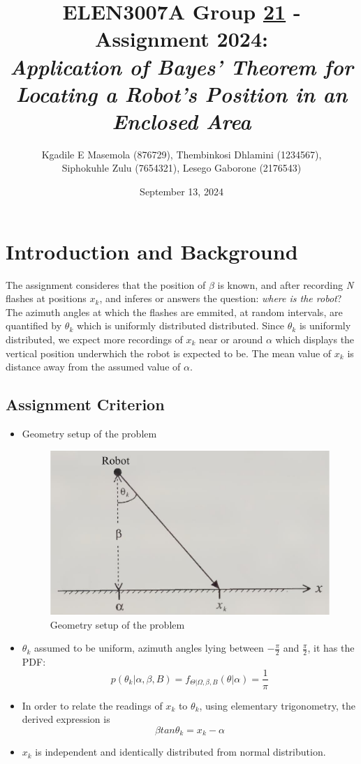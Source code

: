 \documentclass[a4paper,11pt]{article}
\title{ELEN3007A Group \underline{21} - Assignment 2024: \\ 
\large \emph{Application of Bayes’ Theorem for Locating a Robot’s
Position in an Enclosed Area}}
\author{Kgadile E Masemola (876729),  Thembinkosi Dhlamini (1234567),
 \\Siphokuhle Zulu (7654321), Lesego Gaborone (2176543)}
\date{September 13, 2024}
\begin{document}
\maketitle

\section*{Introduction and Background}
The assignment consideres that the position of $\beta$ is known, and after recording \emph{N} flashes at positions $x_k$, and inferes or answers the question: \emph{where is the robot}?\\
The azimuth angles at which the flashes are emmited, at random intervals, are quantified by $\theta_k$ which is uniformly distributed distributed. Since $\theta_k$ is uniformly distributed, we expect more recordings of $x_k$ near or around $\alpha$ which displays the vertical position underwhich the robot is expected to be. The mean value of $x_k$ is distance away from the assumed value of $\alpha$.

\subsection*{Assignment Criterion}
\begin{itemize}
	\item Geometry setup of the problem
		\begin{figure}[h]
        		\centering
        		\includegraphics[scale=0.5]{elen3007assignfig.png} 
        		\caption{Geometry setup of the problem}
        \end{figure}
	\item $\theta_k$ assumed to be uniform, azimuth angles lying between $-\frac{\pi}{2}$ and $\frac{\pi}{2}$, it has the PDF:
		\begin{equation}
			p(\theta_k | \alpha, \beta, B) = f_{\Theta | \Omega, \beta, B}( \theta |\alpha) = \frac{1}{\pi}
		\end{equation}
	\item In order to relate the readings of $x_k$ to $\theta_k$, using elementary trigonometry, the derived expression is
		\begin{equation}
			\beta tan \theta_k = x_k - \alpha
		\end{equation}
	\item $x_k$ is independent and identically distributed from normal distribution.
\end{itemize}
\end{document}
